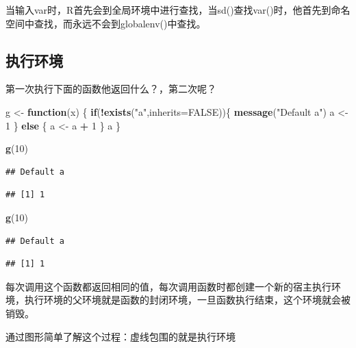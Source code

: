 \documentclass[]{book}
\newenvironment{Shaded}{\begin{snugshade}}{\end{snugshade}}
\newcommand{\KeywordTok}[1]{\textcolor[rgb]{0.13,0.29,0.53}{\textbf{#1}}}
\newcommand{\DataTypeTok}[1]{\textcolor[rgb]{0.13,0.29,0.53}{#1}}
\newcommand{\DecValTok}[1]{\textcolor[rgb]{0.00,0.00,0.81}{#1}}
\newcommand{\StringTok}[1]{\textcolor[rgb]{0.31,0.60,0.02}{#1}}
\newcommand{\OtherTok}[1]{\textcolor[rgb]{0.56,0.35,0.01}{#1}}
\newcommand{\ControlFlowTok}[1]{\textcolor[rgb]{0.13,0.29,0.53}{\textbf{#1}}}
\newcommand{\OperatorTok}[1]{\textcolor[rgb]{0.81,0.36,0.00}{\textbf{#1}}}
\newcommand{\NormalTok}[1]{#1}
\begin{document}
当输入var时，R首先会到全局环境中进行查找，当sd()查找var()时，他首先到命名空间中查找，而永远不会到globalenv()中查找。

\subsection{执行环境}

第一次执行下面的函数他返回什么？，第二次呢？

\begin{Shaded}
\begin{Highlighting}[]
\NormalTok{g <-}\StringTok{ }\ControlFlowTok{function}\NormalTok{(x) \{}
  \ControlFlowTok{if}\NormalTok{(}\OperatorTok{!}\KeywordTok{exists}\NormalTok{(}\StringTok{"a"}\NormalTok{,}\DataTypeTok{inherits=}\OtherTok{FALSE}\NormalTok{))\{}
    \KeywordTok{message}\NormalTok{(}\StringTok{"Default a"}\NormalTok{)}
\NormalTok{    a <-}\StringTok{ }\DecValTok{1}
\NormalTok{  \} }\ControlFlowTok{else}\NormalTok{ \{}
\NormalTok{    a <-}\StringTok{ }\NormalTok{a }\OperatorTok{+}\StringTok{ }\DecValTok{1}
\NormalTok{  \}}
\NormalTok{  a}
\NormalTok{\}}

\KeywordTok{g}\NormalTok{(}\DecValTok{10}\NormalTok{)}
\end{Highlighting}
\end{Shaded}

\begin{verbatim}
## Default a
\end{verbatim}

\begin{verbatim}
## [1] 1
\end{verbatim}

\begin{Shaded}
\begin{Highlighting}[]
\KeywordTok{g}\NormalTok{(}\DecValTok{10}\NormalTok{)}
\end{Highlighting}
\end{Shaded}

\begin{verbatim}
## Default a
\end{verbatim}

\begin{verbatim}
## [1] 1
\end{verbatim}

每次调用这个函数都返回相同的值，每次调用函数时都创建一个新的宿主执行环境，执行环境的父环境就是函数的封闭环境，一旦函数执行结束，这个环境就会被销毁。

通过图形简单了解这个过程：虚线包围的就是执行环境
\end{document}
